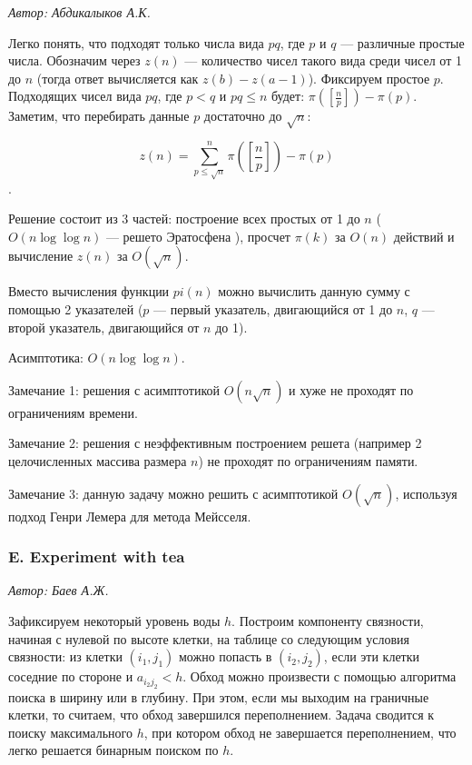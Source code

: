\documentclass[12pt, a4paper]{article}
\newcommand{\problemauthor}[1]{
\begin{flushright}
\textit{Автор: #1}
\end{flushright}
}
\begin{document}
\problemauthor{ Абдикалыков А.К.}

Легко понять, что подходят только числа вида $pq$, где $p$ и $q$ --- различные простые числа. Обозначим через $z(n)$ --- количество чисел такого вида среди чисел от 1 до $n$ (тогда ответ вычисляется как $z(b) - z(a-1)$). Фиксируем простое $p$. Подходящих чисел вида $pq$, где $p < q$ и $pq \le n$ будет: $ \pi\left( \left[ \frac{n}{p} \right] \right) - \pi(p)$. Заметим, что перебирать данные $p$ достаточно до $\sqrt{n}$:

$$z(n) = \sum_{p \le \sqrt{n}}^{n} \pi\left(\left[ \frac{n}{p} \right] \right) - \pi(p)$$.

Решение состоит из 3 частей: построение всех простых от 1 до $n$ ($O(n \log \log{n})$ --- решето Эратосфена ), просчет $\pi(k)$ за $O(n)$ действий и вычисление $z(n)$ за $O(\sqrt{n})$. 

Вместо вычисления функции $pi(n)$ можно вычислить данную сумму с помощью 2 указателей ($p$ --- первый указатель, двигающийся от 1 до $n$, $q$ --- второй указатель, двигающийся от $n$ до 1).

Асимптотика: $O(n \log \log{n})$. 

Замечание 1: решения с асимптотикой $O(n \sqrt{n})$ и хуже не проходят по ограничениям времени.

Замечание 2: решения с неэффективным построением решета (например 2 целочисленных массива размера $n$) не проходят по ограничениям памяти.

Замечание 3: данную задачу можно решить с асимптотикой $O( \sqrt{n} )$, используя подход Генри Лемера для метода Мейсселя.



\subsubsection*{E. Experiment with tea} 

\problemauthor{ Баев А.Ж.}

Зафиксируем некоторый уровень воды $h$. Построим компоненту связности, начиная с нулевой по высоте клетки, на таблице со следующим условия связности: из клетки $(i_1, j_1)$ можно попасть в $(i_2, j_2)$, если эти клетки соседние по стороне и $a_{i_2 j_2} < h$. Обход можно произвести с помощью алгоритма поиска в ширину или в глубину. При этом, если мы выходим на граничные клетки, то считаем, что обход завершился переполнением. Задача сводится к поиску максимального $h$, при котором обход не завершается переполнением, что легко решается бинарным поиском по $h$.
\end{document}
